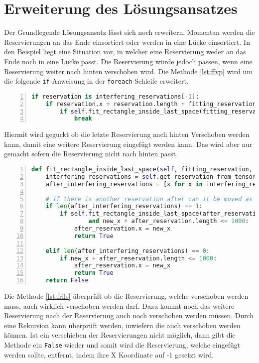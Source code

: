 \chapter{Erweiterung des Lösungsansatzes}
Der Grundlegende Lösungsansatz lässt sich noch erweitern. Momentan werden die Reservierungen an das Ende einsortiert oder werden in eine Lücke einsortiert. In den Beispiel liegt eine Situation vor, in welcher eine Reservierung weder an das Ende noch in eine Lücke passt. Die Reservierung würde jedoch passen, wenn eine Reservierung weiter nach hinten verschoben wird. Die Methode \ref{lst:ffvp} wird um die folgende \texttt{if}-Anweisung in der \texttt{foreach}-Schleife erweitert.

\begin{lstlisting}[language=python,caption={Erweiterung der ffvp-Methode},captionpos=b,label={lst:effvp},escapechar=|,numbers=left]
if reservation is interfering_reservations[-1]:
    if reservation.x + reservation.length + fitting_reservation.length > 1000:
        if self.fit_rectangle_inside_last_space(fitting_reservation, reservation, x_pos + fitting_reservation.length):
            break
\end{lstlisting}

Hiermit wird geguckt ob die letzte Reservierung nach hinten Verschoben werden kann, damit eine weitere Reservierung eingefügt werden kann. Das wird aber nur gemacht sofern die Reservierung nicht nach hinten passt.

\begin{lstlisting}[language=python,caption={fit\_rectangle\_inside\_last\_space-Methode},captionpos=b,label={lst:frils},escapechar=|,numbers=left]
def fit_rectangle_inside_last_space(self, fitting_reservation, after_reservation, new_x=0):
    interfering_reservations = self.get_reservation_from_tensor(after_reservation)
    after_interfering_reservations = [x for x in interfering_reservations if x.x > new_x]

    # if there is another reservation after can it be moved as well
    if len(after_interfering_reservations) == 1:
        if self.fit_rectangle_inside_last_space(after_reservation, after_interfering_reservations[0], new_x + after_reservation.length) \
                and new_x + after_reservation.length <= 1000:
            after_reservation.x = new_x
            return True

    elif len(after_interfering_reservations) == 0:
        if new_x + after_reservation.length <= 1000:
            after_reservation.x = new_x
            return True
    return False
\end{lstlisting}

Die Methode \ref{lst:frils} überprüft ob die Reservierung, welche verschoben werden muss, auch wirklich verschoben werden darf. Dazu kommt noch das weitere Reservierung nach der Reservierung auch noch verschoben werden müssen. Durch eine Rekursion kann überprüft werden, inwiefern die auch verschoben werden können. Ist ein verschieben der Reservierungen nicht möglich, dann gibt die Methode ein \texttt{False} wieder und somit wird die Reservierung, welche eingefügt werden sollte, entfernt, indem ihre X Koordinate auf -1 gesetzt wird.

